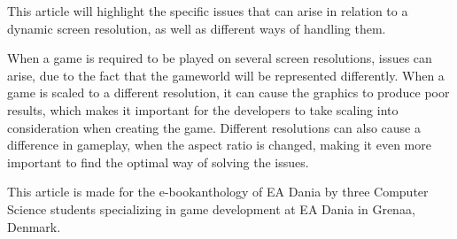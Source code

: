 

This article will highlight the specific issues that can arise in relation to a dynamic screen resolution, as well as different ways of handling them.

When a game is required to be played on several screen resolutions, issues can arise, due to the fact that the gameworld will be represented differently. When a game is scaled to a different resolution, it can cause the graphics to produce poor results, which makes it important for the developers to take scaling into consideration when creating the game. Different resolutions can also cause a difference in gameplay, when the aspect ratio is changed, making it even more important to find the optimal way of solving the issues.

This article is made for the e-bookanthology of EA Dania by three Computer Science students specializing in game development at EA Dania in Grenaa, Denmark.

